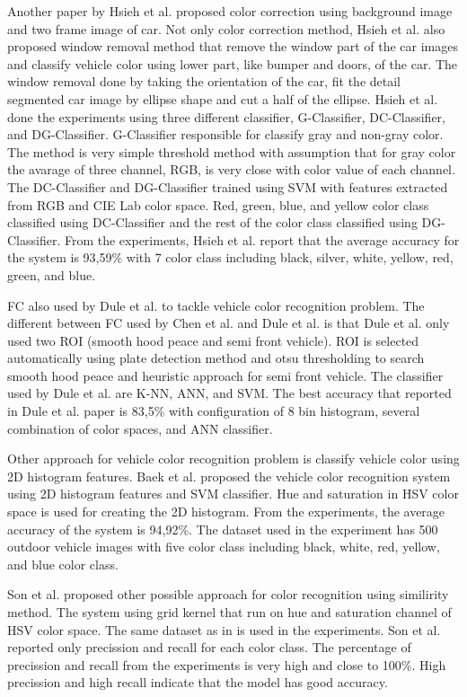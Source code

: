 \documentclass[conference]{IEEEtran}
\begin{document}
Another paper by Hsieh et al. \cite{hsieh} proposed color correction using background image and two frame image of car. Not only color correction method, Hsieh et al. also proposed window removal method that remove the window part of the car images and classify vehicle color using lower part, like bumper and doors, of the car. The window removal done by taking the orientation of the car, fit the detail segmented car image by ellipse shape and cut a half of the ellipse. Hsieh et al. done the experiments using three different classifier, G-Classifier, DC-Classifier, and DG-Classifier. G-Classifier responsible for classify gray and non-gray color. The method is very simple threshold method with assumption that for gray color the avarage of three channel, RGB, is very close with color value of each channel. The DC-Classifier and DG-Classifier trained using SVM with features extracted from RGB and CIE Lab color space. Red, green, blue, and yellow color class classified using DC-Classifier and the rest of the color class classified using DG-Classifier. From the experiments, Hsieh et al. report that the average accuracy for the system is 93,59\% with 7 color class including black, silver, white, yellow, red, green, and blue.

FC also used by Dule et al. \cite{dule} to tackle vehicle color recognition problem. The different between FC used by Chen et al. and Dule et al. is that Dule et al. only used two ROI (smooth hood peace and semi front vehicle). ROI is selected automatically using plate detection method and otsu thresholding to search smooth hood peace and heuristic approach for semi front vehicle. The classifier used by Dule et al. are K-NN, ANN, and SVM. The best accuracy that reported in Dule et al. paper is 83,5\% with configuration of 8 bin histogram, several combination of color spaces, and ANN classifier.   

Other approach for vehicle color recognition problem is classify vehicle color using 2D histogram features. Baek et al. \cite{baek} proposed the vehicle color recognition system using 2D histogram features and SVM classifier. Hue and saturation in HSV color space is used for creating the 2D histogram. From the experiments, the average accuracy of the system is 94,92\%. The dataset used in the experiment has 500 outdoor vehicle images with five color class including black, white, red, yellow, and blue color class.

Son et al. \cite{jwson} proposed other possible approach for color recognition using similirity method. The system using grid kernel that run on hue and saturation channel of HSV color space. The same dataset as in \cite{baek} is used in the experiments. Son et al. reported only precission and recall for each color class. The percentage of precission and recall from the experiments is very high and close to 100\%. High precission and high recall indicate that the model has good accuracy.
\end{document}
